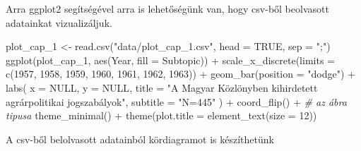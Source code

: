 \documentclass[
]{book}
\newenvironment{Shaded}{\begin{snugshade}}{\end{snugshade}}
\newcommand{\AttributeTok}[1]{\textcolor[rgb]{0.77,0.63,0.00}{#1}}
\newcommand{\CommentTok}[1]{\textcolor[rgb]{0.56,0.35,0.01}{\textit{#1}}}
\newcommand{\ConstantTok}[1]{\textcolor[rgb]{0.00,0.00,0.00}{#1}}
\newcommand{\DecValTok}[1]{\textcolor[rgb]{0.00,0.00,0.81}{#1}}
\newcommand{\FunctionTok}[1]{\textcolor[rgb]{0.00,0.00,0.00}{#1}}
\newcommand{\NormalTok}[1]{#1}
\newcommand{\OtherTok}[1]{\textcolor[rgb]{0.56,0.35,0.01}{#1}}
\newcommand{\SpecialCharTok}[1]{\textcolor[rgb]{0.00,0.00,0.00}{#1}}
\newcommand{\StringTok}[1]{\textcolor[rgb]{0.31,0.60,0.02}{#1}}
\begin{document}
Arra ggplot2 segítségével arra is lehetőségünk van, hogy csv-ből
beolvasott adatainkat vizualizáljuk.

\begin{Shaded}
\begin{Highlighting}[]
\NormalTok{plot\_cap\_1 }\OtherTok{\textless{}{-}} \FunctionTok{read.csv}\NormalTok{(}\StringTok{"data/plot\_cap\_1.csv"}\NormalTok{, }\AttributeTok{head =} \ConstantTok{TRUE}\NormalTok{, }\AttributeTok{sep =} \StringTok{";"}\NormalTok{)}
\FunctionTok{ggplot}\NormalTok{(plot\_cap\_1, }\FunctionTok{aes}\NormalTok{(Year, }\AttributeTok{fill =}\NormalTok{ Subtopic)) }\SpecialCharTok{+}
  \FunctionTok{scale\_x\_discrete}\NormalTok{(}\AttributeTok{limits =} \FunctionTok{c}\NormalTok{(}\DecValTok{1957}\NormalTok{, }\DecValTok{1958}\NormalTok{, }\DecValTok{1959}\NormalTok{, }\DecValTok{1960}\NormalTok{, }\DecValTok{1961}\NormalTok{, }\DecValTok{1962}\NormalTok{, }\DecValTok{1963}\NormalTok{)) }\SpecialCharTok{+}
  \FunctionTok{geom\_bar}\NormalTok{(}\AttributeTok{position =} \StringTok{"dodge"}\NormalTok{) }\SpecialCharTok{+}
  \FunctionTok{labs}\NormalTok{(}
    \AttributeTok{x =} \ConstantTok{NULL}\NormalTok{, }\AttributeTok{y =} \ConstantTok{NULL}\NormalTok{,}
    \AttributeTok{title =} \StringTok{"A Magyar Közlönyben kihirdetett agrárpolitikai jogszabályok"}\NormalTok{,}
    \AttributeTok{subtitle =} \StringTok{"N=445"}
\NormalTok{  ) }\SpecialCharTok{+}
  \FunctionTok{coord\_flip}\NormalTok{() }\SpecialCharTok{+} \CommentTok{\# az ábra tipusa}
  \FunctionTok{theme\_minimal}\NormalTok{() }\SpecialCharTok{+}
  \FunctionTok{theme}\NormalTok{(}\AttributeTok{plot.title =} \FunctionTok{element\_text}\NormalTok{(}\AttributeTok{size =} \DecValTok{12}\NormalTok{))}
\end{Highlighting}
\end{Shaded}

A csv-ből belolvasott adatainból kördiagramot is készíthetünk
\end{document}
